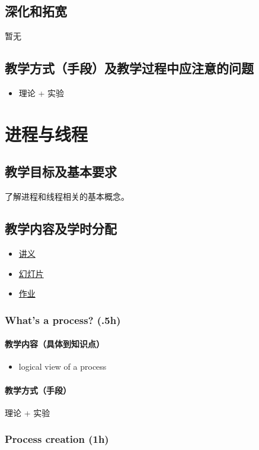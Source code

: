 \documentclass[11pt]{article}
\begin{document}
\subsection{深化和拓宽}
\label{sec-1-4}
暂无
\subsection{教学方式（手段）及教学过程中应注意的问题}
\label{sec-1-5}
\begin{itemize}
\item 理论 + 实验
\end{itemize}
\section{进程与线程}
\label{sec-2}
\subsection{教学目标及基本要求}
\label{sec-2-1}
了解进程和线程相关的基本概念。
\subsection{教学内容及学时分配}
\label{sec-2-2}
\begin{itemize}
\item \href{./slides/process-thread-a.pdf}{讲义}
\item \href{./slides/process-thread-b.pdf}{幻灯片}
\item \href{./lab.html#sec-4}{作业}
\end{itemize}
\subsubsection{What's a process? (.5h)}
\label{sec-2-2-1}
\paragraph{教学内容（具体到知识点）}
\label{sec-2-2-1-1}
\begin{itemize}
\item logical view of a process
\end{itemize}
\paragraph{教学方式（手段）}
\label{sec-2-2-1-2}
理论 + 实验
\subsubsection{Process creation (1h)}
\label{sec-2-2-2}
\end{document}
